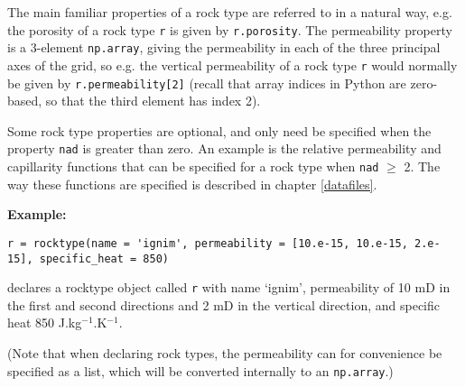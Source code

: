 The main familiar properties of a rock type are referred to in a natural way, e.g. the porosity of a rock type \texttt{r} is given by \texttt{r.porosity}.  The permeability property is a 3-element \texttt{np.array}, giving the permeability in each of the three principal axes of the grid, so e.g. the vertical permeability of a rock type \texttt{r} would normally be given by \texttt{r.permeability[2]} (recall that array indices in Python are zero-based, so that the third element has index 2).

Some rock type properties are optional, and only need be specified when the property \texttt{nad} is greater than zero.  An example is the relative permeability and capillarity functions that can be specified for a rock type when \texttt{nad} $\ge$ 2.  The way these functions are specified is described in chapter \ref{datafiles}.

\textbf{Example:}

\begin{lstlisting}
r = rocktype(name = 'ignim', permeability = [10.e-15, 10.e-15, 2.e-15], specific_heat = 850)
\end{lstlisting}

declares a rocktype object called \texttt{r} with name `ignim', permeability of 10 mD in the first and second directions and 2 mD in the vertical direction, and specific heat 850 J.kg$^{-1}$.K$^{-1}$.

(Note that when declaring rock types, the permeability can for convenience be specified as a list, which will be converted internally to an \texttt{np.array}.)

